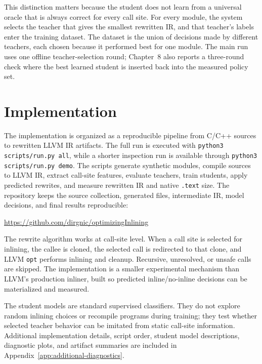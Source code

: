 \documentclass[12pt, a4paper]{report}
\begin{document}
This distinction matters because the student does not learn from a universal
oracle that is always correct for every call site. For every module, the system
selects the teacher that gives the smallest rewritten IR, and that teacher's
labels enter the training dataset. The dataset is the union of decisions made by
different teachers, each chosen because it performed best for one module. The
main run uses one offline teacher-selection round; Chapter~8
also reports a three-round check where the best learned student is inserted back
into the measured policy set.


\chapter{Implementation}

The implementation is organized as a reproducible pipeline from C/C++ sources
to rewritten LLVM IR artifacts. The full run is executed with
\texttt{python3 scripts/run.py all}, while a shorter inspection run is available
through \texttt{python3 scripts/run.py demo}. The scripts generate synthetic
modules, compile sources to LLVM IR, extract call-site features, evaluate
teachers, train students, apply predicted rewrites, and measure rewritten IR and
native \texttt{.text} size. The repository keeps the source collection,
generated files, intermediate IR, model decisions, and final results
reproducible:
\begin{center}
\small\url{https://github.com/dirgnic/optimizingInlining}
\end{center}

The rewrite algorithm works at call-site level. When a call site is selected for
inlining, the callee is cloned, the selected call is redirected to that clone,
and LLVM \texttt{opt} performs inlining and cleanup. Recursive, unresolved, or
unsafe calls are skipped. The implementation is a smaller experimental mechanism
than LLVM's production inliner, built so predicted inline/no-inline decisions can
be materialized and measured.

The student models are standard supervised classifiers. They do not explore
random inlining choices or recompile programs during training; they test
whether selected teacher behavior can be imitated from static call-site
information. Additional implementation details, script order, student model
descriptions, diagnostic plots, and artifact summaries are included in
Appendix~\ref{app:additional-diagnostics}.
\end{document}
